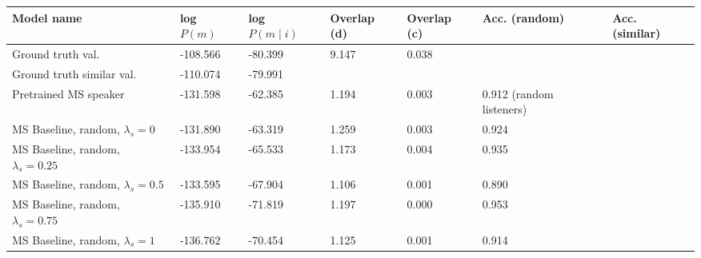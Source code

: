 \begin{table}[]
	\begin{tabularx}{\textwidth}{|X|l|l|X|X|X|X|}
		\hline
		\textbf{Model name}                                    & \textbf{log $P(m)$} & \textbf{log $P(m \mid i)$} & \textbf{Overlap (d)} & \textbf{Overlap (c)} & \textbf{Acc. (random)} & \textbf{Acc. (similar)} \\ \hline
		Ground truth val.               &     -108.566            &          -80.399             &    9.147           &       0.038          &            &                           \\ \hline
		Ground truth similar val.               &     -110.074        &       -79.991           &             &           &            &                           \\ \hline
		Pretrained MS speaker               &      -131.598            &           -62.385             &          1.194            &           0.003           & 0.912 (random listeners)                 &                                           \\ \hline
		MS Baseline, random, $\lambda_s = 0$      &     -131.890              &         -63.319               &        1.259       &         0.003             &             0.924                             &                                           \\ \hline
		MS Baseline, random, $\lambda_s = 0.25$    &      -133.954             &          -65.533              &          1.173            &       0.004               &           0.935                               &                                           \\ \hline
		MS Baseline, random, $\lambda_s = 0.5$      &         -133.595         &           -67.904             &        1.106              &        0.001              &             0.890                             &                                           \\ \hline
		MS Baseline, random, $\lambda_s = 0.75$   &       -135.910            &             -71.819          &        1.197              &        0.000              & 0.953                                    &                                           \\ \hline
		MS Baseline, random, $\lambda_s =1$  &      -136.762             &          -70.454              &         1.125             &          0.001            &                   0.914                       &                                           \\ \hline

\end{tabularx}
\end{table}
